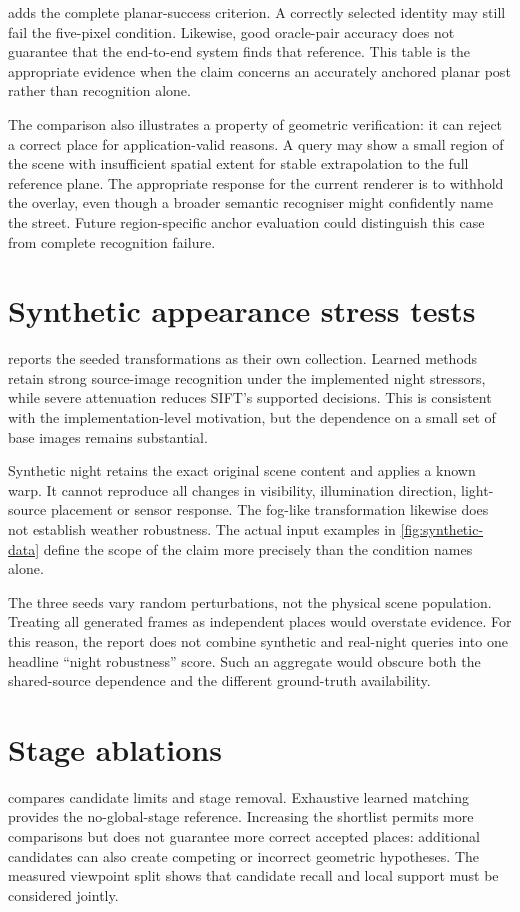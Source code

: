  adds the complete planar-success criterion. A correctly selected identity may still fail the five-pixel condition. Likewise, good oracle-pair accuracy does not guarantee that the end-to-end system finds that reference. This table is the appropriate evidence when the claim concerns an accurately anchored planar post rather than recognition alone.

The comparison also illustrates a property of geometric verification: it can reject a correct place for application-valid reasons. A query may show a small region of the scene with insufficient spatial extent for stable extrapolation to the full reference plane. The appropriate response for the current renderer is to withhold the overlay, even though a broader semantic recogniser might confidently name the street. Future region-specific anchor evaluation could distinguish this case from complete recognition failure.

\section{Synthetic appearance stress tests}
 reports the seeded transformations as their own collection. Learned methods retain strong source-image recognition under the implemented night stressors, while severe attenuation reduces SIFT's supported decisions. This is consistent with the implementation-level motivation, but the dependence on a small set of base images remains substantial.

Synthetic night retains the exact original scene content and applies a known warp. It cannot reproduce all changes in visibility, illumination direction, light-source placement or sensor response. The fog-like transformation likewise does not establish weather robustness. The actual input examples in \cref{fig:synthetic-data} define the scope of the claim more precisely than the condition names alone.

The three seeds vary random perturbations, not the physical scene population. Treating all generated frames as independent places would overstate evidence. For this reason, the report does not combine synthetic and real-night queries into one headline ``night robustness'' score. Such an aggregate would obscure both the shared-source dependence and the different ground-truth availability.

\section{Stage ablations}
 compares candidate limits and stage removal. Exhaustive learned matching provides the no-global-stage reference. Increasing the shortlist permits more comparisons but does not guarantee more correct accepted places: additional candidates can also create competing or incorrect geometric hypotheses. The measured viewpoint split shows that candidate recall and local support must be considered jointly.

